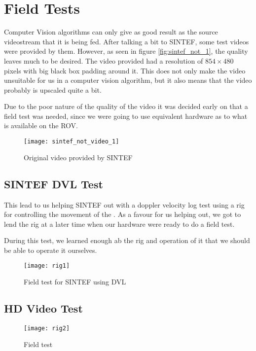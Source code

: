 
\chapter{Field Tests}\label{ch:field_test}

Computer Vision algorithms can only give as good result as the source videostream that it is 
being fed. After talking a bit to SINTEF, some test videos were provided by them. However, as seen in figure 
\vref{fig:sintef_not_1}, the quality leaves much to be desired. The video provided had a resolution 
of $854 \times 480$ pixels with big black box padding around it. This does not only make 
the video unsuitable for us in a computer vision algorithm, but it also means that the video 
probably is upscaled quite a bit.

Due to the poor nature of the quality of the video it was decided early on that 
a field test was needed, since we were going to use equivalent hardware as to what is available on the ROV. 

\begin{figure}[htbp]
	\centering
	\texttt{[image: sintef\_not\_video\_1]}
	\caption{Original video provided by SINTEF}
	\label{fig:sintef_not_1}
\end{figure}

\section{SINTEF DVL Test}
This lead to us helping SINTEF out with a doppler velocity log test using a rig for controlling 
the movement of the . As a favour for us helping out, we 
got to lend the rig at a later time when our hardware were ready to do a field test. 

During this test, we learned enough ab the rig and operation of it that we should be able to operate 
it ourselves.

\begin{figure}[htbp]
	\centering
	\texttt{[image: rig1]}
	\caption{Field test for SINTEF using DVL}
	\label{fig:test_dvl}
\end{figure}

\section{HD Video Test}

\begin{figure}[htbp]
	\centering
	\texttt{[image: rig2]}
	\caption{Field test}
	\label{fig:test_hd}
\end{figure}

